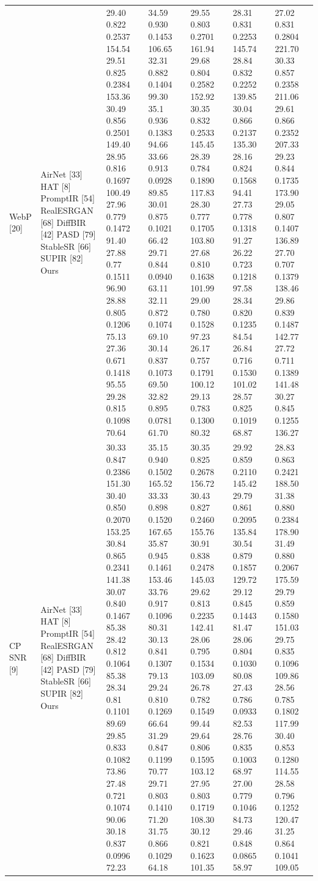 \begin{tabular}{lllllll}
WebP [20] & AirNet [33] HAT [8] PromptIR [54] RealESRGAN [68] DiffBIR [42] PASD [79] StableSR [66] SUPIR [82] Ours & 29.40 0.822 0.2537 154.54 29.51 0.825 0.2384 153.36 30.49 0.856 0.2501 149.40 28.95 0.816 0.1697 100.49 27.96 0.779 0.1472 91.40 27.88 0.77 0.1511 96.90 28.88 0.805 0.1206 75.13 27.36 0.671 0.1418 95.55 29.28 0.815 0.1098 70.64 & 34.59 0.930 0.1453 106.65 32.31 0.882 0.1404 99.30 35.1 0.936 0.1383 94.66 33.66 0.913 0.0928 89.85 30.01 0.875 0.1021 66.42 29.71 0.844 0.0940 63.11 32.11 0.872 0.1074 69.10 30.14 0.837 0.1073 69.50 32.82 0.895 0.0781 61.70 & 29.55 0.803 0.2701 161.94 29.68 0.804 0.2582 152.92 30.35 0.832 0.2533 145.45 28.39 0.784 0.1890 117.83 28.30 0.777 0.1705 103.80 27.68 0.810 0.1638 101.99 29.00 0.780 0.1528 97.23 26.17 0.757 0.1791 100.12 29.13 0.783 0.1300 80.32 & 28.31 0.831 0.2253 145.74 28.84 0.832 0.2252 139.85 30.04 0.866 0.2137 135.30 28.16 0.824 0.1568 94.41 27.73 0.778 0.1318 91.27 26.22 0.723 0.1218 97.58 28.34 0.820 0.1235 84.54 26.84 0.716 0.1530 101.02 28.57 0.825 0.1019 68.87 & 27.02 0.831 0.2804 221.70 30.33 0.857 0.2358 211.06 29.61 0.866 0.2352 207.33 29.23 0.844 0.1735 173.90 29.05 0.807 0.1407 136.89 27.70 0.707 0.1379 138.46 29.86 0.839 0.1487 142.77 27.72 0.711 0.1389 141.48 30.27 0.845 0.1255 136.27 \\
CP SNR [9] & AirNet [33] HAT [8] PromptIR [54] RealESRGAN [68] DiffBIR [42] PASD [79] StableSR [66] SUPIR [82] Ours & 30.33 0.847 0.2386 151.30 30.40 0.850 0.2070 153.25 30.84 0.865 0.2341 141.38 30.07 0.840 0.1467 85.38 28.42 0.812 0.1064 85.38 28.34 0.81 0.1101 89.69 29.85 0.833 0.1082 73.86 27.48 0.721 0.1074 90.06 30.18 0.837 0.0996 72.23 & 35.15 0.940 0.1502 165.52 33.33 0.898 0.1520 167.65 35.87 0.945 0.1461 153.46 33.76 0.917 0.1096 80.31 30.13 0.841 0.1307 79.13 29.24 0.810 0.1269 66.64 31.29 0.847 0.1199 70.77 29.71 0.803 0.1410 71.20 31.75 0.866 0.1029 64.18 & 30.35 0.825 0.2678 156.72 30.43 0.827 0.2460 155.76 30.91 0.838 0.2478 145.03 29.62 0.813 0.2235 142.41 28.06 0.795 0.1534 103.09 26.78 0.782 0.1549 99.44 29.64 0.806 0.1595 103.12 27.95 0.803 0.1719 108.30 30.12 0.821 0.1623 101.35 & 29.92 0.859 0.2110 145.42 29.79 0.861 0.2095 135.84 30.54 0.879 0.1857 129.72 29.12 0.845 0.1443 81.47 28.06 0.804 0.1030 80.08 27.43 0.786 0.0933 82.53 28.76 0.835 0.1003 68.97 27.00 0.779 0.1046 84.73 29.46 0.848 0.0865 58.97 & 28.83 0.863 0.2421 188.50 31.38 0.880 0.2384 178.90 31.49 0.880 0.2067 175.59 29.79 0.859 0.1580 151.03 29.75 0.835 0.1096 109.86 28.56 0.785 0.1802 117.99 30.40 0.853 0.1280 114.55 28.58 0.796 0.1252 120.47 31.25 0.864 0.1041 109.05 \\

\end{tabular}
